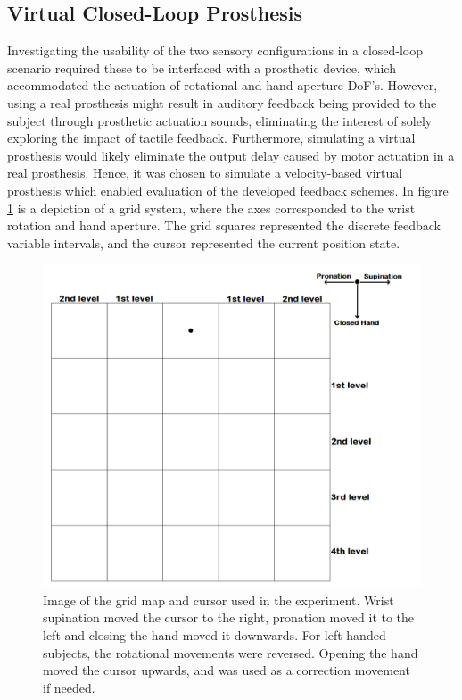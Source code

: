 
\subsection{Virtual Closed-Loop Prosthesis}
 
Investigating the usability of the two sensory configurations in a closed-loop scenario required these to be interfaced with a prosthetic device, which accommodated the actuation of rotational and hand aperture DoF's. However, using a real prosthesis might result in auditory feedback being provided to the subject through prosthetic actuation sounds, eliminating the interest of solely exploring the impact of tactile feedback. Furthermore, simulating a virtual prosthesis would likely eliminate the output delay caused by motor actuation in a real prosthesis. Hence, it was chosen to simulate a velocity-based virtual prosthesis which enabled evaluation of the developed feedback schemes. In figure \ref{fig:pa:gridmap} is a depiction of a grid system, where the axes corresponded to the wrist rotation and hand aperture. The grid squares represented the discrete feedback variable intervals, and the cursor represented the current position state.  
\begin{figure}[H]                 
	\includegraphics[width=1\textwidth]{figures/gridmap2}  
	\caption{Image of the grid map and cursor used in the experiment. Wrist supination moved the cursor to the right, pronation moved it to the left and closing the hand moved it downwards. For left-handed subjects, the rotational movements were reversed. Opening the hand moved the cursor upwards, and was used as a correction movement if needed.}
	\label{fig:pa:gridmap} 
\end{figure}
